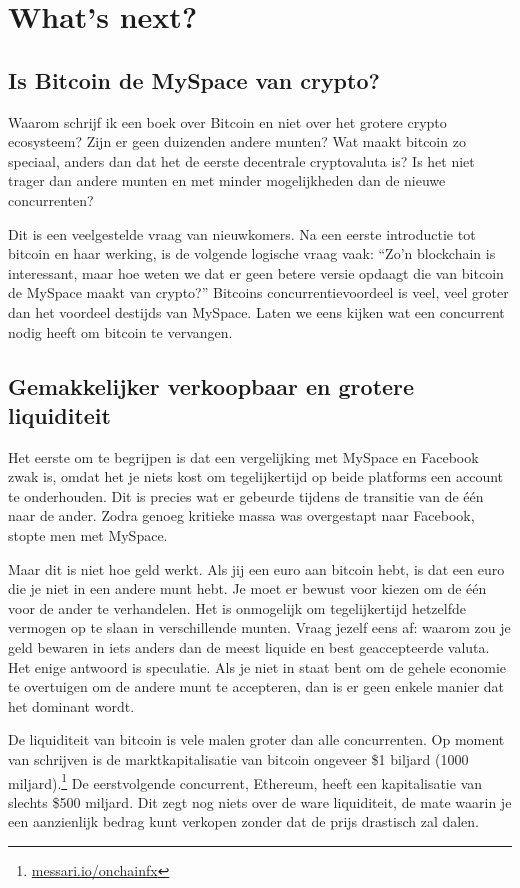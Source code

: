 \chapter{What's next?}

\section{Is Bitcoin de MySpace van crypto?}

Waarom schrijf ik een boek over Bitcoin en niet over het grotere crypto ecosysteem? Zijn er geen duizenden andere munten? Wat maakt bitcoin zo speciaal, anders dan dat het de eerste decentrale cryptovaluta is? Is het niet trager dan andere munten en met minder mogelijkheden dan de nieuwe concurrenten?

Dit is een veelgestelde vraag van nieuwkomers. Na een eerste introductie tot bitcoin en haar werking, is de volgende logische vraag vaak: ``Zo'n blockchain is interessant, maar hoe weten we dat er geen betere versie opdaagt die van bitcoin de MySpace maakt van crypto?'' Bitcoins concurrentievoordeel is veel, veel groter dan het voordeel destijds van MySpace. Laten we eens kijken wat een concurrent nodig heeft om bitcoin te vervangen.

\section{Gemakkelijker verkoopbaar en grotere liquiditeit}

Het eerste om te begrijpen is dat een vergelijking met MySpace en Facebook zwak is, omdat het je niets kost om tegelijkertijd op beide platforms een account te onderhouden. Dit is precies wat er gebeurde tijdens de transitie van de één naar de ander. Zodra genoeg kritieke massa was overgestapt naar Facebook, stopte men met MySpace.

Maar dit is niet hoe geld werkt. Als jij een euro aan bitcoin hebt, is dat een euro die je niet in een andere munt hebt. Je moet er bewust voor kiezen om de één voor de ander te verhandelen. Het is onmogelijk om tegelijkertijd hetzelfde vermogen op te slaan in verschillende munten. Vraag jezelf eens af: waarom zou je geld bewaren in iets anders dan de meest liquide en best geaccepteerde valuta. Het enige antwoord is speculatie. Als je niet in staat bent om de gehele economie te overtuigen om de andere munt te accepteren, dan is er geen enkele manier dat het dominant wordt. 

De liquiditeit van bitcoin is vele malen groter dan alle concurrenten. Op moment van schrijven is de marktkapitalisatie van bitcoin ongeveer \$1 biljard (1000 miljard).\footnote{\href{https://messari.io/onchainfx}{messari.io/onchainfx}} De eerstvolgende concurrent, Ethereum, heeft een kapitalisatie van slechts \$500 miljard. Dit zegt nog niets over de ware liquiditeit, de mate waarin je een aanzienlijk bedrag kunt verkopen zonder dat de prijs drastisch zal dalen. 

